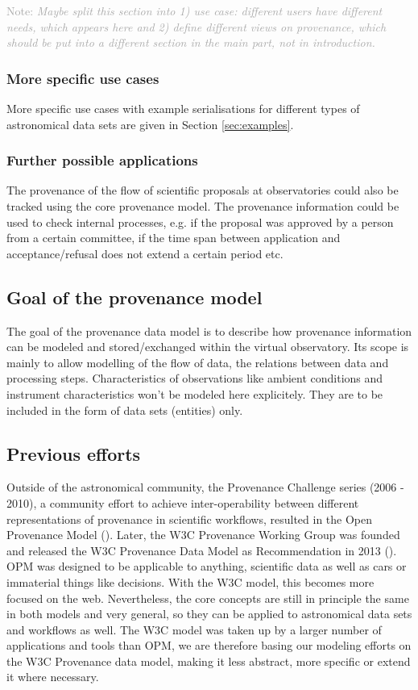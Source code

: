 \documentclass[11pt,a4paper]{ivoa}
\newcommand{\Note}[1]{%
    \noindent%
    \textcolor{darkgrey}{{\sffamily Note:} \emph{#1}}%
}
\begin{document}
\Note{Maybe split this section into 1) use case: different users have different needs, which appears here and 2) define different views on provenance, which should be put into a different section in the main part, not in introduction.}


\subsubsection{More specific use cases}
More specific use cases with example serialisations for different types of astronomical data sets are given in Section \ref{sec:examples}.
    

\subsubsection{Further possible applications}

The provenance of the flow of scientific proposals at observatories could also be tracked using the core provenance model. The provenance information could be used to check internal processes, e.g. if the proposal was approved by a person from a certain committee, if the time span between application and acceptance/refusal does not extend a certain period etc. 


\subsection{Goal of the provenance model}
The goal of the provenance data model is to describe how provenance information can be modeled and stored/exchanged within the virtual observatory. Its scope is mainly to allow modelling of the flow of data, the relations between data and processing steps. Characteristics of observations like ambient conditions and instrument characteristics won't be modeled here explicitely. They are to be included in the form of data sets (entities) only.


\subsection{Previous efforts}

Outside of the astronomical community, the Provenance Challenge series (2006 - 2010), a community effort to achieve inter-operability between different representations of provenance in scientific workflows, resulted in the Open Provenance Model (\cite{moreau2010}). 
Later, the W3C Provenance Working Group was founded and released the W3C Provenance Data Model as Recommendation in 2013 (\cite{std:W3CProvDM}). 
OPM was designed to be applicable to anything, scientific data as well as cars or immaterial things like decisions. With the W3C model, this becomes more focused on the web.  Nevertheless, the core concepts are still in principle the same in both models and very general, so they can be applied to astronomical data sets and workflows as well. 
The W3C model was taken up by a larger number of applications and tools than OPM, we are therefore basing our modeling efforts on the W3C Provenance data model, making it less abstract, more specific or extend it where necessary. 
\end{document}
